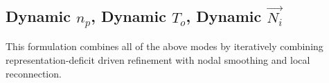 \subsection{Dynamic $n_p$, Dynamic $T_o$, Dynamic $\vec{N_i}$}
This formulation combines all of the above modes by iteratively
combining representation-deficit driven refinement with nodal smoothing
and local reconnection.

%
%
%
%
